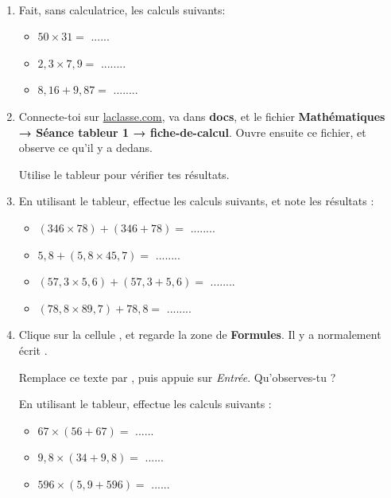 \documentclass[a4paper,11pt]{article}
\begin{document}
\begin{exercice}\
	\begin{enumerate}
		\item Fait, sans calculatrice, les calculs suivants:
		      \begin{itemize}
			      \item $50 × 31 = $ ...... %
			      \item $2{,}3 × 7{,}9 = $ ........ %
			      \item $8{,}16 + 9{,}87 = $ ........ %
		      \end{itemize}
		\item Connecte-toi sur \url{laclasse.com}, va dans  \textbf{docs}, et  le fichier \textbf{Mathématiques → Séance tableur 1 → fiche-de-calcul}. Ouvre ensuite ce fichier, et observe ce qu'il y a dedans. \vspace{1em}

		      Utilise le tableur pour vérifier tes résultats.
		\item En utilisant le tableur, effectue les calculs suivants, et note les résultats :
		      \begin{itemize}
			      \item $(346 × 78) + (346 + 78) = $ ........
			      \item $5{,}8 + (5{,}8 × 45{,}7) = $ ........
			      \item $(57{,}3 × 5{,}6) + (57{,}3 + 5{,}6) = $ ........
			      \item $(78{,}8 × 89{,}7) + 78{,}8 = $ ........
		      \end{itemize}
		\item Clique sur la cellule , et regarde la zone de \textbf{Formules}. Il y a normalement écrit .

		      Remplace ce texte par , puis appuie sur \textit{Entrée}. Qu'observes-tu ?

		      En utilisant le tableur, effectue les calculs suivants :
		      \begin{itemize}
			      \item $67 × (56 + 67) = $ ......

			      \item $9{,}8 × (34 + 9{,}8) = $ ......

			      \item $596 × (5{,}9 + 596) = $ ......
		      \end{itemize}
	\end{enumerate}
\end{exercice}
\end{document}
